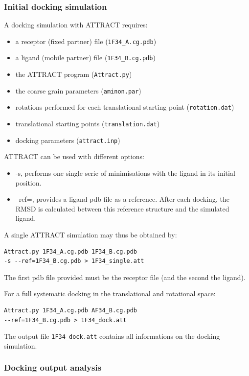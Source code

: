 \documentclass[12pt,a4paper]{article}
\begin{document}
\subsubsection{Initial docking simulation}

A docking simulation with ATTRACT requires:
\begin{itemize}
\item a receptor (fixed partner) file ({\tt 1F34\_A.cg.pdb})
\item a ligand (mobile partner) file ({\tt 1F34\_B.cg.pdb})
\item the ATTRACT program ({\tt  Attract.py})
\item the coarse grain parameters ({\tt aminon.par})
\item rotations performed for each translational starting point ({\tt rotation.dat})
\item translational starting points ({\tt translation.dat})
\item docking parameters ({\tt attract.inp})
\end{itemize}

ATTRACT can be used with different options:
\begin{itemize}
\item -s, performs one single serie of minimisations with the ligand in its initial position.
\item --ref=, provides a ligand pdb file as a reference. After each docking, the RMSD is calculated between this reference structure and the simulated ligand.
\end{itemize}

A single ATTRACT simulation may thus be obtained by:
\begin{verbatim}
Attract.py 1F34_A.cg.pdb 1F34_B.cg.pdb 
-s --ref=1F34_B.cg.pdb > 1F34_single.att
\end{verbatim}

The first pdb file provided must be the receptor file (and the second the ligand).

For a full systematic docking in the translational and rotational space:
\begin{verbatim}
Attract.py 1F34_A.cg.pdb AF34_B.cg.pdb 
--ref=1F34_B.cg.pdb > 1F34_dock.att
\end{verbatim}

The output file {\tt 1F34\_dock.att} contains all informations on the docking simulation.

\subsubsection{Docking output analysis}
\end{document}
